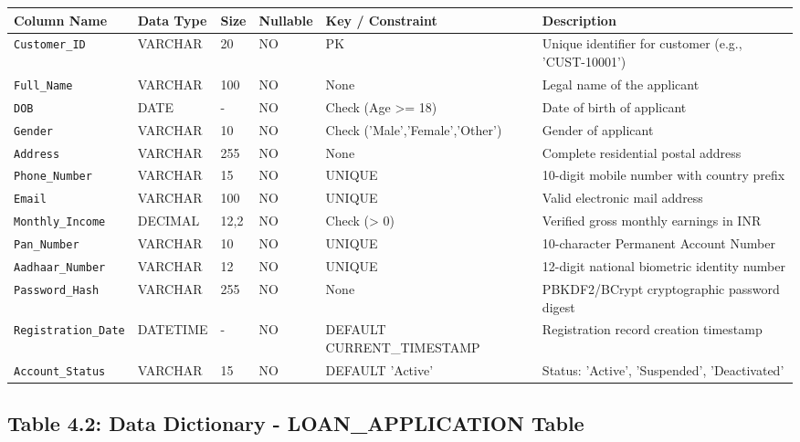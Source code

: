 \documentclass[12pt,a4paper,oneside]{report}
\begin{document}
\begin{table}[htbp]
\centering
\small
\begin{tabularx}{\textwidth}{p{2.5cm} X X X X X}
\toprule
\textbf{Column Name} & \textbf{Data Type} & \textbf{Size} & \textbf{Nullable} & \textbf{Key / Constraint} & \textbf{Description} \\
\midrule
\texttt{Customer\_ID} & VARCHAR & 20 & NO & PK & Unique identifier for customer (e.g., 'CUST-10001') \\
\texttt{Full\_Name} & VARCHAR & 100 & NO & None & Legal name of the applicant \\
\texttt{DOB} & DATE & - & NO & Check (Age >= 18) & Date of birth of applicant \\
\texttt{Gender} & VARCHAR & 10 & NO & Check ('Male','Female','Other') & Gender of applicant \\
\texttt{Address} & VARCHAR & 255 & NO & None & Complete residential postal address \\
\texttt{Phone\_Number} & VARCHAR & 15 & NO & UNIQUE & 10-digit mobile number with country prefix \\
\texttt{Email} & VARCHAR & 100 & NO & UNIQUE & Valid electronic mail address \\
\texttt{Monthly\_Income} & DECIMAL & 12,2 & NO & Check (> 0) & Verified gross monthly earnings in INR \\
\texttt{Pan\_Number} & VARCHAR & 10 & NO & UNIQUE & 10-character Permanent Account Number \\
\texttt{Aadhaar\_Number} & VARCHAR & 12 & NO & UNIQUE & 12-digit national biometric identity number \\
\texttt{Password\_Hash} & VARCHAR & 255 & NO & None & PBKDF2/BCrypt cryptographic password digest \\
\texttt{Registration\_Date} & DATETIME & - & NO & DEFAULT CURRENT\_TIMESTAMP & Registration record creation timestamp \\
\texttt{Account\_Status} & VARCHAR & 15 & NO & DEFAULT 'Active' & Status: 'Active', 'Suspended', 'Deactivated' \\
\bottomrule
\end{tabularx}
\end{table}

\subsection{Table 4.2: Data Dictionary - LOAN\_APPLICATION Table}
\end{document}
